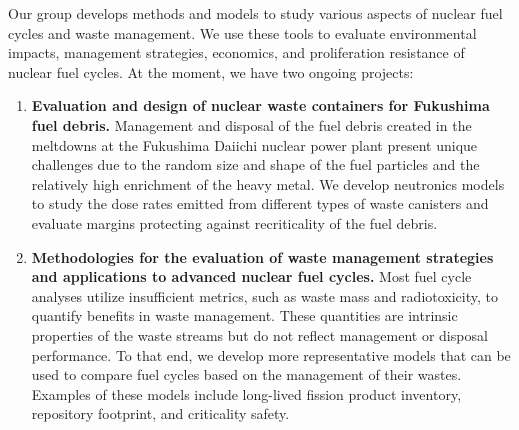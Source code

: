 Our group develops methods and models to study various aspects of nuclear fuel cycles and waste management. 
We use these tools to evaluate environmental impacts, management strategies, economics, and proliferation resistance of nuclear fuel cycles. 
At the moment, we have two ongoing projects:
\begin{enumerate}
	\item \textbf{Evaluation and design of nuclear waste containers for Fukushima fuel debris.}
	Management and disposal of the fuel debris created in the meltdowns at the Fukushima Daiichi nuclear power plant present unique challenges due to the random size and shape of the fuel particles and the relatively high enrichment of the heavy metal.
	We develop neutronics models to study the dose rates emitted from different types of waste canisters and evaluate margins protecting against recriticality of the fuel debris.
	\item \textbf{Methodologies for the evaluation of waste management strategies and applications to advanced nuclear fuel cycles.}
	Most fuel cycle analyses utilize insufficient metrics, such as waste mass and radiotoxicity, to quantify benefits in waste management. 
	These quantities are intrinsic properties of the waste streams but do not reflect management or disposal performance. 
	To that end, we develop more representative models that can be used to compare fuel cycles based on the management of their wastes. 
	Examples of these models include long-lived fission product inventory, repository footprint, and criticality safety.
\end{enumerate}



\vspace{-0.75cm}

